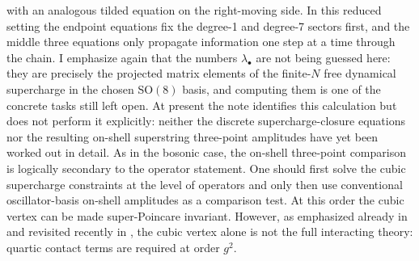 \documentclass[11pt]{article}
\numberwithin{equation}{section}
\begin{document}
with an analogous tilded equation on the right-moving side. In this reduced setting the endpoint equations fix the degree-1 and degree-7 sectors first, and the middle three equations only propagate information one step at a time through the chain. I emphasize again that the numbers $\lambda_\bullet$ are not being guessed here: they are precisely the projected matrix elements of the finite-$N$ free dynamical supercharge in the chosen SO$(8)$ basis, and computing them is one of the concrete tasks still left open.
At present the note identifies this calculation but does not perform it explicitly: neither the discrete supercharge-closure equations nor the resulting on-shell superstring three-point amplitudes have yet been worked out in detail. As in the bosonic case, the on-shell three-point comparison is logically secondary to the operator statement. One should first solve the cubic supercharge constraints at the level of operators and only then use conventional oscillator-basis on-shell amplitudes as a comparison test. At this order the cubic vertex can be made super-Poincare invariant. However, as emphasized already in \cite{GreenSeiberg1988} and revisited recently in \cite{Ando2025}, the cubic vertex alone is not the full interacting theory: quartic contact terms are required at order $g^2$.
\end{document}
